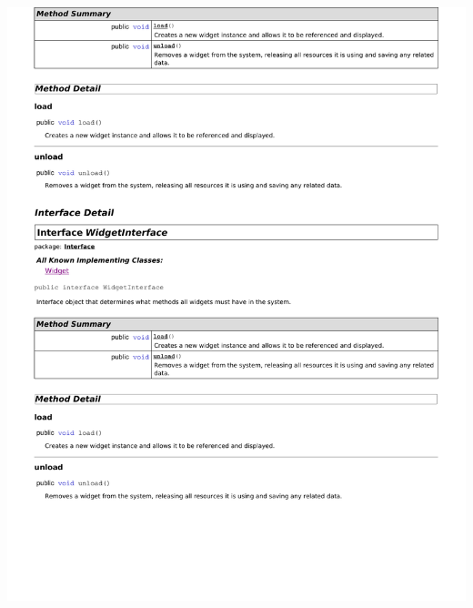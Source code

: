 \documentclass[letterpaper,12pt]{report}
\begin{document}
\newpage
\includegraphics[scale=0.9,trim=20mm 30mm 25mm 5mm]{externals/di12.pdf}
\newpage
\end{document}
